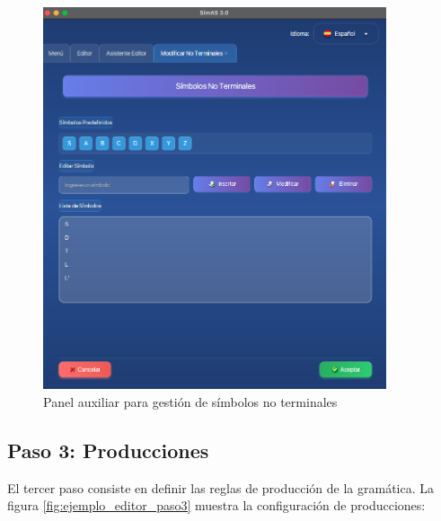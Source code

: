\needspace{8cm}
\begin{figure}[H]
    \centering
    \includegraphics[width=0.9\textwidth]{figuras/ejemplo_practico/insertar_no_terminales.png}
    \caption{Panel auxiliar para gestión de símbolos no terminales}
    \label{fig:ejemplo_insertar_no_terminales}
\end{figure}

\subsection{Paso 3: Producciones}

El tercer paso consiste en definir las reglas de producción de la gramática. La figura \ref{fig:ejemplo_editor_paso3} muestra la configuración de producciones:

